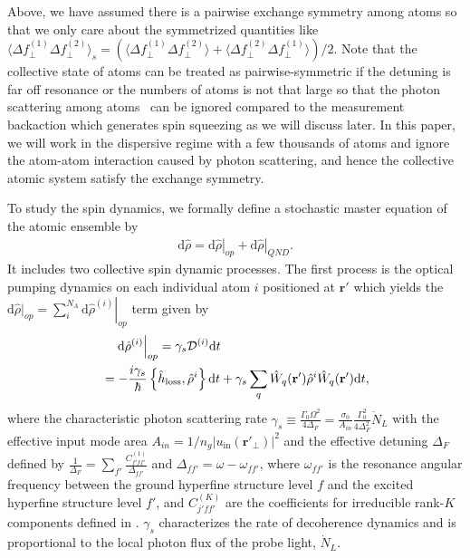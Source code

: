 \documentclass[pra,twocolumn,floatfix,superscriptaddress]{revtex4-1} %
\def\br{\mathbf{r}}
\newcommand{\expect}[1]{\big\langle #1 \big\rangle}
\begin{document}
Above, we have assumed there is a pairwise exchange symmetry among atoms so that we only care about the symmetrized quantities like $ \expect{\Delta f_\perp^{(1)}\Delta f_\perp^{(2)}}_s=\left(\expect{\Delta f_\perp^{(1)}\Delta f_\perp^{(2)}} + \expect{\Delta f_\perp^{(2)}\Delta f_\perp^{(1)}} \right)/2 $. 
Note that the collective state of atoms can be treated as pairwise-symmetric if the detuning is far off resonance or the numbers of atoms is not that large so that the photon scattering among atoms~\cite{Asenjo-Garcia2017Atom,Asenjo-Garcia2017Exponential} can be ignored compared to the measurement backaction which generates spin squeezing as we will discuss later.
In this paper, we will work in the dispersive regime with a few thousands of atoms and ignore the atom-atom interaction caused by photon scattering, and hence the collective atomic system satisfy the exchange symmetry. 


To study the spin dynamics, we formally define a stochastic master equation of the atomic ensemble by
\begin{align}\label{eq:totaldrhodt}
\mathrm{d}\hat{\rho}=\left.\mathrm{d}\hat{\rho}\right|_{op} + \left.\mathrm{d}\hat{\rho}\right|_{QND}.
\end{align}
It includes two collective spin dynamic processes. 
The first process is the optical pumping dynamics on each individual atom $i$ positioned at $\br'$ which yields the $\mathrm{d}\hat{\rho}|_{op}=\sum_i^{N_A} \left.\mathrm{d}\hat{\rho}^{(i)}\right|_{op} $ term given by
\begin{align}
&\quad\left.\mathrm{d}\hat{\rho}^{(i)}\right|_{op} =\gamma_s\mathcal{D}^{(i)}\mathrm{d}t\\
&= -\frac{i\gamma_s}{\hbar} \left\{\hat{h}_{\rm loss},\hat{\rho}^{i} \right\}\mathrm{d}t + \gamma_s\sum_q \hat{W}_q(\br')\hat{\rho}^{i}\hat{W}_q(\br')\mathrm{d}t,
\end{align}
where the characteristic photon scattering rate $ \gamma_s\equiv \frac{\Gamma_0\Omega^2}{4\Delta_F}=\frac{\sigma_0}{A_{in}}\frac{\Gamma_0^2}{4\Delta_F^2}\dot{N}_L $ with the effective input mode area $ A_{in}=1/n_g|u_{\mathrm{in}}(\br'\!_\perp)|^2 $ and the effective detuning $ \Delta_F $ defined by $ \frac{1}{\Delta_F}=\sum_{f'}\frac{C_{f'ff'}^{(1)}}{\Delta_{ff'}} $ and $ \Delta_{ff'}=\omega-\omega_{ff'} $, where $ \omega_{ff'} $ is the resonance angular frequency between the ground hyperfine structure level $ f $ and the excited hyperfine structure level $ f' $, and $ C_{j'ff'}^{(K)} $ are the coefficients for irreducible rank-$K$ components defined in \cite{Deutsch2010a}.
$\gamma_s$ characterizes the rate of decoherence dynamics and is proportional to the local photon flux of the probe light, $ \dot{N}_L $.
\end{document}
